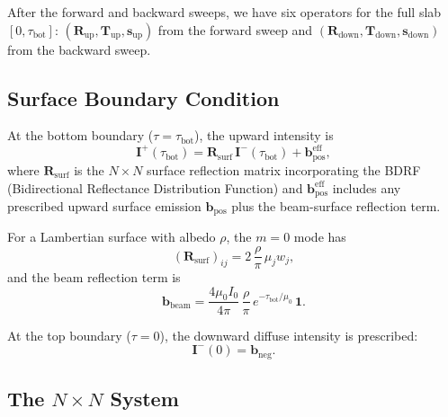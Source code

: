 \documentclass[11pt,a4paper]{article}
\newcommand{\vect}[1]{\bm{#1}}
\newcommand{\mat}[1]{\mathbf{#1}}
\newcommand{\tbot}{\tau_{\mathrm{bot}}}
\theoremstyle{definition}
\begin{document}
After the forward and backward sweeps, we have six operators for the
full slab $[0, \tbot]$:
$(\mat{R}_{\mathrm{up}}, \mat{T}_{\mathrm{up}}, \vect{s}_{\mathrm{up}})$
from the forward sweep and
$(\mat{R}_{\mathrm{down}}, \mat{T}_{\mathrm{down}}, \vect{s}_{\mathrm{down}})$
from the backward sweep.

\subsection{Surface Boundary Condition}

At the bottom boundary ($\tau = \tbot$), the upward intensity is
\begin{equation}\label{eq:surface-bc}
  \vect{I}^+(\tbot)
  = \mat{R}_{\mathrm{surf}}\,\vect{I}^-(\tbot)
    + \vect{b}_{\mathrm{pos}}^{\mathrm{eff}},
\end{equation}
where $\mat{R}_{\mathrm{surf}}$ is the $N\!\times\!N$ surface
reflection matrix incorporating the BDRF (Bidirectional Reflectance
Distribution Function) and $\vect{b}_{\mathrm{pos}}^{\mathrm{eff}}$
includes any prescribed upward surface emission $\vect{b}_{\mathrm{pos}}$
plus the beam-surface reflection term.

For a Lambertian surface with albedo $\rho$, the $m=0$ mode has
\begin{equation}
  (\mat{R}_{\mathrm{surf}})_{ij}
  = 2\,\frac{\rho}{\pi}\,\mu_j w_j,
\end{equation}
and the beam reflection term is
\begin{equation}
  \vect{b}_{\mathrm{beam}} = \frac{4\mu_0 I_0}{4\pi}\,
  \frac{\rho}{\pi}\,e^{-\tbot/\mu_0}\,\vect{1}.
\end{equation}

At the top boundary ($\tau = 0$), the downward diffuse intensity is
prescribed:
\begin{equation}\label{eq:top-bc}
  \vect{I}^-(0) = \vect{b}_{\mathrm{neg}}.
\end{equation}

\subsection{The \texorpdfstring{$N\!\times\!N$}{NxN} System}
\end{document}
